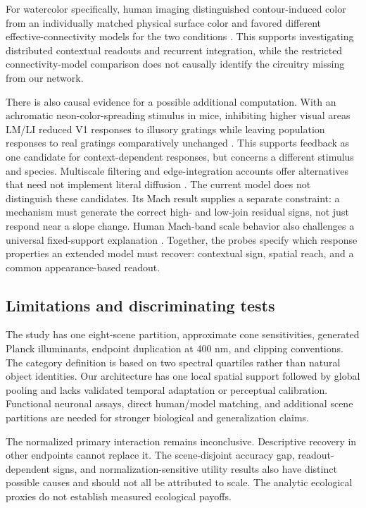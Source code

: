 \documentclass[authoryear,preprint,review,12pt]{elsarticle}
\begin{document}
For watercolor specifically, human imaging distinguished contour-induced color from an individually matched physical surface color and favored different effective-connectivity models for the two conditions \citep{gerardin2018circuits}. This supports investigating distributed contextual readouts and recurrent integration, while the restricted connectivity-model comparison does not causally identify the circuitry missing from our network.

There is also causal evidence for a possible additional computation. With an achromatic neon-color-spreading stimulus in mice, inhibiting higher visual areas LM/LI reduced V1 responses to illusory gratings while leaving population responses to real gratings comparatively unchanged \citep{saeedi2024brightness}. This supports feedback as one candidate for context-dependent responses, but concerns a different stimulus and species. Multiscale filtering and edge-integration accounts offer alternatives that need not implement literal diffusion \citep{otazu2010chrom,rudd2014edge}. The current model does not distinguish these candidates. Its Mach result supplies a separate constraint: a mechanism must generate the correct high- and low-join residual signs, not just respond near a slope change. Human Mach-band scale behavior also challenges a universal fixed-support explanation \citep{wallis2012mach}. Together, the probes specify which response properties an extended model must recover: contextual sign, spatial reach, and a common appearance-based readout.

\subsection{Limitations and discriminating tests}\label{sec:limitations}
The study has one eight-scene partition, approximate cone sensitivities, generated Planck illuminants, endpoint duplication at 400 nm, and clipping conventions. The category definition is based on two spectral quartiles rather than natural object identities. Our architecture has one local spatial support followed by global pooling and lacks validated temporal adaptation or perceptual calibration. Functional neuronal assays, direct human/model matching, and additional scene partitions are needed for stronger biological and generalization claims.

The normalized primary interaction remains inconclusive. Descriptive recovery in other endpoints cannot replace it. The scene-disjoint accuracy gap, readout-dependent signs, and normalization-sensitive utility results also have distinct possible causes and should not all be attributed to scale. The analytic ecological proxies do not establish measured ecological payoffs.
\end{document}
